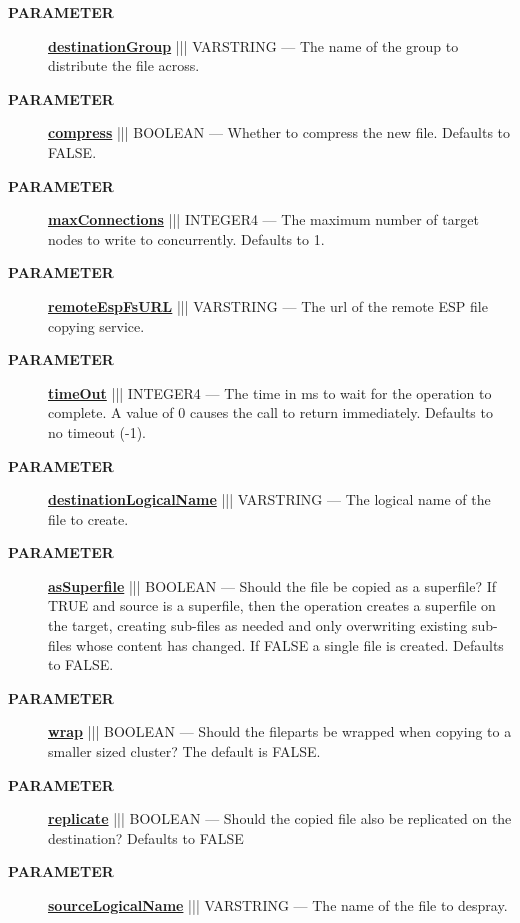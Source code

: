 \par
\begin{description}
\item [\colorbox{tagtype}{\color{white} \textbf{\textsf{PARAMETER}}}] \textbf{\underline{destinationGroup}} ||| VARSTRING --- The name of the group to distribute the file across.
\item [\colorbox{tagtype}{\color{white} \textbf{\textsf{PARAMETER}}}] \textbf{\underline{compress}} ||| BOOLEAN --- Whether to compress the new file. Defaults to FALSE.
\item [\colorbox{tagtype}{\color{white} \textbf{\textsf{PARAMETER}}}] \textbf{\underline{maxConnections}} ||| INTEGER4 --- The maximum number of target nodes to write to concurrently. Defaults to 1.
\item [\colorbox{tagtype}{\color{white} \textbf{\textsf{PARAMETER}}}] \textbf{\underline{remoteEspFsURL}} ||| VARSTRING --- The url of the remote ESP file copying service.
\item [\colorbox{tagtype}{\color{white} \textbf{\textsf{PARAMETER}}}] \textbf{\underline{timeOut}} ||| INTEGER4 --- The time in ms to wait for the operation to complete. A value of 0 causes the call to return immediately. Defaults to no timeout (-1).
\item [\colorbox{tagtype}{\color{white} \textbf{\textsf{PARAMETER}}}] \textbf{\underline{destinationLogicalName}} ||| VARSTRING --- The logical name of the file to create.
\item [\colorbox{tagtype}{\color{white} \textbf{\textsf{PARAMETER}}}] \textbf{\underline{asSuperfile}} ||| BOOLEAN --- Should the file be copied as a superfile? If TRUE and source is a superfile, then the operation creates a superfile on the target, creating sub-files as needed and only overwriting existing sub-files whose content has changed. If FALSE a single file is created. Defaults to FALSE.
\item [\colorbox{tagtype}{\color{white} \textbf{\textsf{PARAMETER}}}] \textbf{\underline{wrap}} ||| BOOLEAN --- Should the fileparts be wrapped when copying to a smaller sized cluster? The default is FALSE.
\item [\colorbox{tagtype}{\color{white} \textbf{\textsf{PARAMETER}}}] \textbf{\underline{replicate}} ||| BOOLEAN --- Should the copied file also be replicated on the destination? Defaults to FALSE
\item [\colorbox{tagtype}{\color{white} \textbf{\textsf{PARAMETER}}}] \textbf{\underline{sourceLogicalName}} ||| VARSTRING --- The name of the file to despray.

\end{description}
